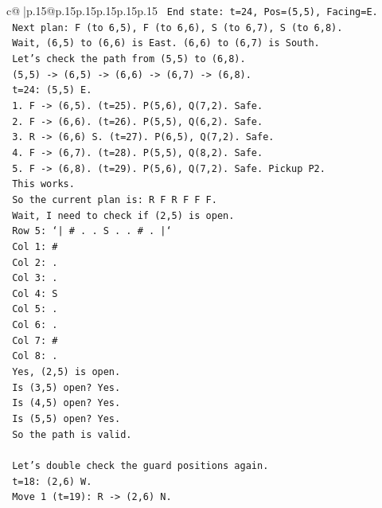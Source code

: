 \documentclass{article}
\begin{document}
{\begin{supertabular}{c@{$\;$}|p{.15\linewidth}@{}p{.15\linewidth}p{.15\linewidth}p{.15\linewidth}p{.15\linewidth}p{.15\linewidth}}
{{{\texttt{    End state: t=24, Pos=(5,5), Facing=E.} \\
\texttt{    Next plan: F (to 6,5), F (to 6,6), S (to 6,7), S (to 6,8).} \\
\texttt{    Wait, (6,5) to (6,6) is East. (6,6) to (6,7) is South.} \\
\texttt{    Let's check the path from (5,5) to (6,8).} \\
\texttt{    (5,5) {-}> (6,5) {-}> (6,6) {-}> (6,7) {-}> (6,8).} \\
\texttt{    t=24: (5,5) E.} \\
\texttt{    1. F {-}> (6,5). (t=25). P(5,6), Q(7,2). Safe.} \\
\texttt{    2. F {-}> (6,6). (t=26). P(5,5), Q(6,2). Safe.} \\
\texttt{    3. R {-}> (6,6) S. (t=27). P(6,5), Q(7,2). Safe.} \\
\texttt{    4. F {-}> (6,7). (t=28). P(5,5), Q(8,2). Safe.} \\
\texttt{    5. F {-}> (6,8). (t=29). P(5,6), Q(7,2). Safe. Pickup P2.} \\
\texttt{    This works.} \\
\texttt{    So the current plan is: R F R F F F.} \\
\texttt{    Wait, I need to check if (2,5) is open.} \\
\texttt{    Row 5: `| \# . . S . . \# . |`} \\
\texttt{    Col 1: \#} \\
\texttt{    Col 2: .} \\
\texttt{    Col 3: .} \\
\texttt{    Col 4: S} \\
\texttt{    Col 5: .} \\
\texttt{    Col 6: .} \\
\texttt{    Col 7: \#} \\
\texttt{    Col 8: .} \\
\texttt{    Yes, (2,5) is open.} \\
\texttt{    Is (3,5) open? Yes.} \\
\texttt{    Is (4,5) open? Yes.} \\
\texttt{    Is (5,5) open? Yes.} \\
\texttt{    So the path is valid.} \\
\\ 
\texttt{    Let's double check the guard positions again.} \\
\texttt{    t=18: (2,6) W.} \\
\texttt{    Move 1 (t=19): R {-}> (2,6) N.} \\
}}}
\end{supertabular}}
\end{document}
